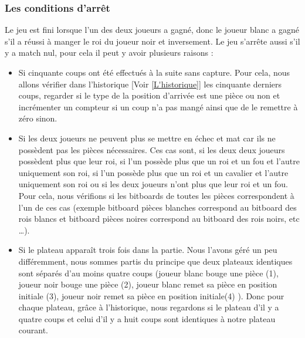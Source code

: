 \documentclass{article}
\begin{document}
\subsubsection{Les conditions d'arrêt} \label{Architecture_condition_d'arrêt}
Le jeu est fini lorsque l'un des deux joueurs a gagné, donc le joueur blanc a gagné s'il a réussi à manger le roi du joueur noir et inversement.\newline
Le jeu s'arrête aussi s'il y a match nul, pour cela il peut y avoir plusieurs raisons :
\begin{itemize}
    \item Si cinquante coups ont été effectués à la suite sans capture.\newline
    Pour cela, nous allons vérifier dans l'historique [Voir \ref{L'historique}] les cinquante derniers coups, regarder si le type de la position d'arrivée est une pièce ou non et incrémenter un compteur si un coup n'a pas mangé ainsi que de le remettre à zéro sinon.
    \item Si les deux joueurs ne peuvent plus se mettre en échec et mat car ils ne possèdent pas les pièces nécessaires.\newline
    Ces cas sont, si les deux deux joueurs possèdent plus que leur roi, si l'un possède plus que un roi et un fou et l'autre uniquement son roi, si l'un possède plus que un roi et un cavalier et l'autre uniquement son roi ou si les deux joueurs n'ont plus que leur roi et un fou.\newline
    Pour cela, nous vérifions si les bitboards de toutes les pièces correspondent à l'un de ces cas (exemple bitboard pièces blanches correspond au bitboard des rois blancs et bitboard pièces noires correspond au bitboard des rois noirs, etc \dots).
    \item Si le plateau apparaît trois fois dans la partie.\newline
    Nous l'avons géré un peu différemment, nous sommes partis du principe que deux plateaux identiques sont séparés d'au moins quatre coups (joueur blanc bouge une pièce (1), joueur noir bouge une pièce (2), joueur blanc remet sa pièce en position initiale (3), joueur noir remet sa pièce en position initiale(4) ).\newline
    Donc pour chaque plateau, grâce à l'historique, nous regardons si le plateau d'il y a quatre coups et celui d'il y a huit coups sont identiques à notre plateau courant.
\end{itemize}
\end{document}
